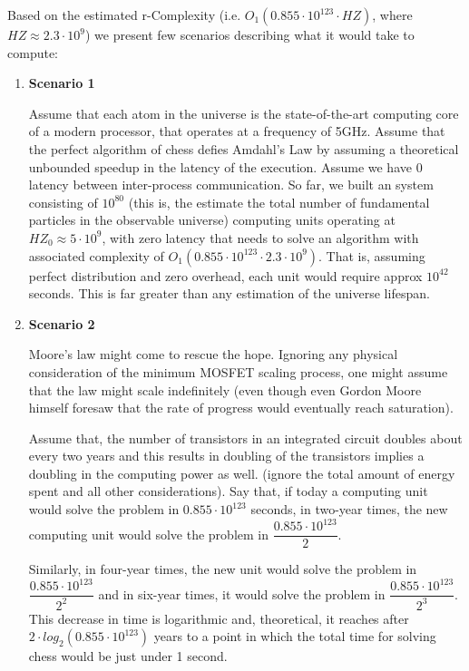 Based on the estimated r-Complexity (i.e. $O_{1}(0.855 \cdot 10^{123} \cdot HZ)$, where $HZ \approx 2.3 \cdot 10^9$) we present few scenarios describing what it would take to compute:
\begin{enumerate}[label=\roman*]
  \item \textbf{Scenario 1} 
  
  Assume that each atom in the universe is the state-of-the-art computing core of a modern processor, that operates at a frequency of 5GHz. Assume that the perfect algorithm of chess defies Amdahl's Law by assuming a theoretical unbounded speedup in the latency of the execution. Assume we have 0 latency between inter-process communication. So far, we built an system consisting of $10^{80}$ (this is, the estimate the total number of fundamental particles in the observable universe) computing units operating at $HZ_0 \approx 5 \cdot 10^9$, with zero latency that needs to solve an algorithm with associated complexity of $O_{1}(0.855 \cdot 10^{123} \cdot 2.3 \cdot 10^9)$. That is, assuming perfect distribution and zero overhead, each unit would require approx $10^{42}$ seconds. This is far greater than any estimation of the universe lifespan.
  \item \textbf{Scenario 2} 
  
  Moore's law might come to rescue the hope. Ignoring any physical consideration of the minimum MOSFET scaling process, one might assume that the law might scale indefinitely (even though even Gordon Moore himself foresaw that the rate of progress would eventually reach saturation). 
  
Assume that, the number of transistors in an integrated circuit doubles about every two years and this results in doubling of the transistors implies a doubling in the computing power as well. (ignore the total amount of energy spent and all other considerations). Say that, if today a computing unit would solve the problem in $0.855 \cdot 10^{123}$ seconds, in two-year times, the new computing unit would solve the problem in $\dfrac{0.855 \cdot 10^{123}}{2}$.
  
Similarly, in four-year times, the new unit would solve the problem in $\dfrac{0.855 \cdot 10^{123}}{2^2}$ and in six-year times, it would solve the problem in $\dfrac{0.855 \cdot 10^{123}}{2^3}$. This decrease in time is logarithmic and, theoretical, it reaches after $2 \cdot log_{2}(0.855 \cdot 10^{123})$ years to a point in which the total time for solving chess would be just under 1 second. 


\end{enumerate}
